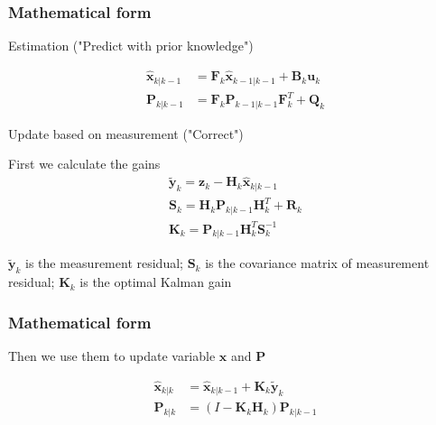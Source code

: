 \documentclass{beamer}
\begin{document}
\begin{frame}
\frametitle{Mathematical form}
\begin{block}{Estimation ("Predict with prior knowledge")}

\begin{equation}
\begin{aligned} \hat{\mathbf{x}}_{k | k-1} &=\mathbf{F}_{k} \hat{\mathbf{x}}_{k-1 | k-1}+\mathbf{B}_{k} \mathbf{u}_{k}\\ \mathbf{P}_{k | k-1} &=\mathbf{F}_{k} \mathbf{P}_{k-1 | k-1} \mathbf{F}_{k}^{T}+\mathbf{Q}_{k} \end{aligned}
\end{equation}

\end{block}

\begin{block}{Update based on measurement ("Correct")}

First we calculate the gains
\begin{equation}
\begin{array}{l}{\tilde{\mathbf{y}}_{k}=\mathbf{z}_{k}-\mathbf{H}_{k} \hat{\mathbf{x}}_{k | k-1} } \\ {\mathbf{S}_{k}=\mathbf{H}_{k} \mathbf{P}_{k | k-1} \mathbf{H}_{k}^{T}+\mathbf{R}_{k}} \\ {\mathbf{K}_{k}=\mathbf{P}_{k | k-1} \mathbf{H}_{k}^{T} \mathbf{S}_{k}^{-1}}\end{array}
\end{equation}

$\tilde{\mathbf{y}}_{k}$ is the measurement residual; $\mathbf{S}_{k}$ is the covariance matrix of measurement residual; $\mathbf{K}_{k}$ is the optimal Kalman gain
\end{block}

\end{frame}

\begin{frame}
\frametitle{Mathematical form}
Then we use them to update variable $\mathbf{x}$ and $\mathbf{P}$

\begin{equation}
\begin{aligned} \hat{\mathbf{x}}_{k | k} &=\hat{\mathbf{x}}_{k | k-1}+\mathbf{K}_{k} \tilde{\mathbf{y}}_{k}\\ \mathbf{P}_{k | k} &=\left(I-\mathbf{K}_{k} \mathbf{H}_{k}\right) \mathbf{P}_{k | k-1} \end{aligned}
\end{equation}

\end{frame}
\end{document}
